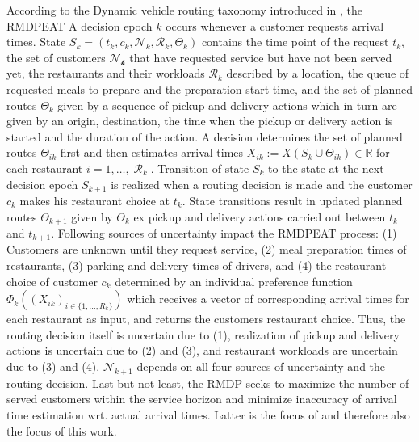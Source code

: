 According to the Dynamic vehicle routing taxonomy introduced in \cite{psaraftis}, the RMDPEAT 
A decision epoch $ k $ occurs whenever a customer requests arrival times. 
State $ S_k = (t_k, c_k, \mathcal{N}_k, \mathcal{R}_k, \Theta_k)$ contains the time point of the request $ t_k $, the set of customers $ \mathcal{N_k} $ that have requested service but have not been served yet, the restaurants and their workloads $ \mathcal{R}_k $ described by a location, the queue of requested meals to prepare and the preparation start time, and the set of planned routes $ \Theta_k $ given by a sequence of pickup and delivery actions which in turn are given by an origin, destination, the time when the pickup or delivery action is started and the duration of the action. 
A decision determines the set of planned routes $ \Theta_{ik} $ first and then estimates arrival times $ X_{ik} := X (S_k \cup \Theta_{ik}) \in \mathbb{R}$ for each restaurant $ i = 1, \dots, |\mathcal{R}_k| $.
Transition of state $ S_k $ to the state at the next decision epoch $ S_{k+1} $ is realized when a routing decision is made and the customer $ c_k $ makes his restaurant choice at $ t_k $. State transitions result in updated planned routes $ \Theta_{k+1} $ given by $ \Theta_k $ ex pickup and delivery actions carried out between $ t_k $ and $ t_{k+1} $. Following sources of uncertainty impact the RMDPEAT process: (1) Customers are unknown until they request service, (2) meal preparation times of restaurants, (3) parking and delivery times of drivers, and (4) the restaurant choice of customer $ c_k $ determined by an individual preference function $ \Phi_k((X_{ik})_{i \in \{1,\dots, R_k\}}) $ which receives a vector of corresponding arrival times for each restaurant as input, and returns the customers restaurant choice. Thus, the routing decision itself is uncertain due to (1), realization of pickup and delivery actions is uncertain due to (2) and (3), and restaurant workloads are uncertain due to (3) and (4). $ \mathcal{N}_{k+1} $ depends on all four sources of uncertainty and the routing decision.
Last but not least, the RMDP seeks to maximize the number of served customers within the service horizon and minimize inaccuracy of arrival time estimation wrt. actual arrival times. Latter is the focus of \cite{Hildebrandt2020_EAT} and therefore also the focus of this work.
 
